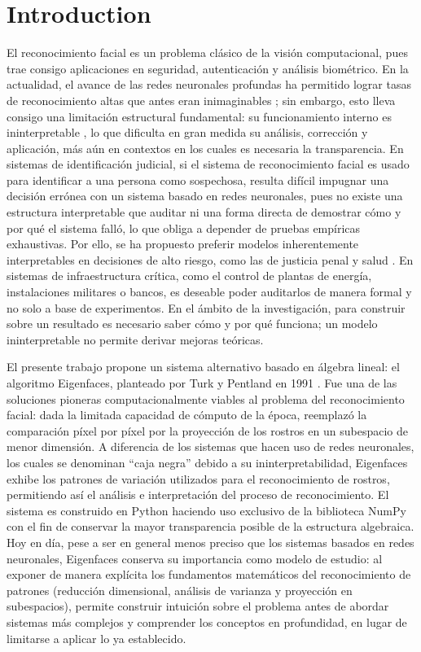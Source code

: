 \section{Introduction}

El reconocimiento facial es un problema clásico de la visión computacional,
pues trae consigo aplicaciones en seguridad, autenticación y análisis biométrico.
En la actualidad, el avance de las redes neuronales profundas
ha permitido lograr tasas de reconocimiento altas que antes eran inimaginables
\cite{taigman2014deepface,schroff2015facenet}; sin embargo, esto lleva consigo una
limitación estructural fundamental: su funcionamiento interno es ininterpretable
\cite{rudin2019stop}, lo que dificulta en gran medida su análisis, corrección y
aplicación, más aún en contextos en los cuales es necesaria la transparencia.
En sistemas de identificación judicial, si el sistema de reconocimiento facial es usado
para identificar a una persona como sospechosa, resulta difícil impugnar una decisión
errónea con un sistema basado en redes neuronales, pues no existe una estructura
interpretable que auditar ni una forma directa de demostrar cómo y por qué el sistema
falló, lo que obliga a depender de pruebas empíricas exhaustivas. Por ello, se ha
propuesto preferir modelos inherentemente interpretables en decisiones de alto riesgo,
como las de justicia penal y salud \cite{rudin2019stop}.
En sistemas de infraestructura crítica, como el control de plantas de energía,
instalaciones militares o bancos, es deseable poder auditarlos de manera formal y no
solo a base de experimentos. En el ámbito de la investigación, para construir sobre un
resultado es necesario saber cómo y por qué funciona; un modelo ininterpretable no
permite derivar mejoras teóricas.

El presente trabajo propone un sistema alternativo basado en álgebra lineal: el
algoritmo Eigenfaces, planteado por Turk y Pentland en 1991 \cite{turk1991eigenfaces}.
Fue una de las soluciones pioneras computacionalmente viables al problema del
reconocimiento facial: dada la limitada capacidad de cómputo de la época, reemplazó la
comparación píxel por píxel por la proyección de los rostros en un subespacio de menor
dimensión.
A diferencia de los sistemas que hacen uso de redes neuronales, los cuales se denominan
``caja negra'' debido a su ininterpretabilidad, Eigenfaces exhibe los patrones de
variación utilizados para el reconocimiento de rostros, permitiendo así el análisis e
interpretación del proceso de reconocimiento. El sistema es construido en Python haciendo
uso exclusivo de la biblioteca NumPy con el fin de conservar la mayor transparencia
posible de la estructura algebraica.
Hoy en día, pese a ser en general menos preciso que los sistemas basados en redes
neuronales, Eigenfaces conserva su importancia como modelo de estudio: al exponer de
manera explícita los fundamentos matemáticos del reconocimiento de patrones (reducción
dimensional, análisis de varianza y proyección en subespacios), permite construir
intuición sobre el problema antes de abordar sistemas más complejos y comprender los
conceptos en profundidad, en lugar de limitarse a aplicar lo ya establecido.

